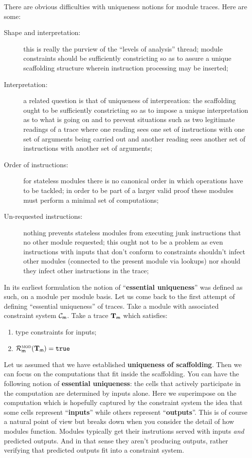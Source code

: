 There are obvious difficulties with uniqueness notions for module traces. Here are some:
\begin{description}
    \item[Shape and interpretation:] this is really the purview of the ``levels of analysis'' thread; module constraints should be sufficiently constricting so as to assure a unique scaffolding structure wherein instruction processing may be inserted;
    \item[Interpretation:] a related question is that of uniqueness of interpreation: the scaffolding ought to be sufficiently constricting so as to impose a unique interpretation as to what is going on and to prevent situations such as two legitimate readings of a trace where one reading sees one set of instructions with one set of arguments being carried out and another reading sees another set of instructions with another set of arguments; 
    \item[Order of instructions:] for stateless modules there is no canonical order in which operations have to be tackled; in order to be part of a larger valid proof these modules must perform a minimal set of computations;
    \item[Un-requested instructions:] nothing prevents stateless modules from executing junk instructions that no other module requested; this ought not to be a problem as even instructions with inputs that don't conform to constraints shouldn't infect other modules (connected to the present module via lookups) nor should they infect other instructions in the trace;
\end{description}
In its earliest formulation the notion of ``\textbf{essential uniqueness}'' was defined as such, on a module per module basis. Let us come back to the first attempt of defining ``essential uniqueness'' of traces. Take a module \moduleName{} with associated constraint system $\mathcal{C}_{\textsf{m}}$. Take a trace $\textbf{T}_{\textsf{m}}$ which satisfies:
\begin{enumerate}
     \item type constraints for \godGiven{} inputs;
     \item $\mathcal{R}^{\textsc{mod}}_{\textsf{m}}(\textbf{T}_{\textsf{m}}) = \mathtt{true}$
\end{enumerate}
Let us assumed that we have established \textbf{uniqueness of scaffolding}. Then we can focus on the computations that fit inside the scaffolding. You can have the following notion of \textbf{essential uniqueness}: the cells that actively participate in the computation are determined by inputs alone. Here we superimpose on the computation which is hopefully captured by the constraint system the idea that some cells represent ``\textbf{inputs}'' while others represent ``\textbf{outputs}''. This is of course a natural point of view but breaks down when you consider the detail of how modules function. Modules typically get their instrutions served with inputs \emph{and} predicted outputs. And in that sense they aren't producing outputs, rather verifying that predicted outputs fit into a constraint system.

